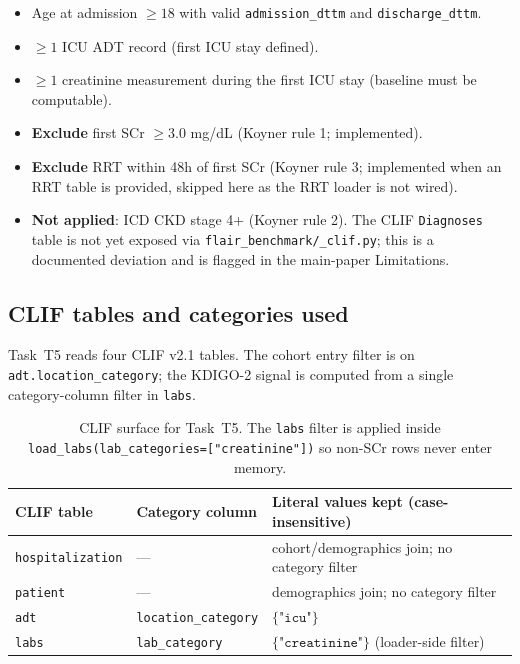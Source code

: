 \documentclass[11pt]{article}
\begin{document}
\begin{itemize}[leftmargin=2em]
  \item Age at admission $\ge 18$ with valid \texttt{admission\_dttm}
        and \texttt{discharge\_dttm}.
  \item $\geq 1$ ICU ADT record (first ICU stay defined).
  \item $\geq 1$ creatinine measurement during the first ICU stay
        (baseline must be computable).
  \item \textbf{Exclude} first SCr $\ge 3.0$ mg/dL (Koyner rule 1;
        implemented).
  \item \textbf{Exclude} RRT within 48h of first SCr (Koyner rule 3;
        implemented when an RRT table is provided, skipped here as the
        RRT loader is not wired).
  \item \textbf{Not applied}: ICD CKD stage 4+ (Koyner rule 2). The
        CLIF \texttt{Diagnoses} table is not yet exposed via
        \texttt{flair\_benchmark/\_clif.py}; this is a documented
        deviation and is flagged in the main-paper Limitations.
\end{itemize}

\subsection{CLIF tables and categories used}
\label{sec:t5-clif}

Task~T5 reads four CLIF v2.1 tables. The cohort entry filter is on
\texttt{adt.location\_category}; the KDIGO-2 signal is computed from a
single category-column filter in \texttt{labs}.

\begin{table}[H]
\centering
\small
\begin{tabular}{@{}llp{7.0cm}@{}}
\toprule
\textbf{CLIF table} & \textbf{Category column} & \textbf{Literal values kept (case-insensitive)} \\
\midrule
\texttt{hospitalization} & ---                       & cohort/demographics join; no category filter \\
\texttt{patient}         & ---                       & demographics join; no category filter \\
\texttt{adt}             & \texttt{location\_category} & $\{\texttt{"icu"}\}$ \\
\texttt{labs}            & \texttt{lab\_category}     & $\{\texttt{"creatinine"}\}$ (loader-side filter) \\
\bottomrule
\end{tabular}
\caption{CLIF surface for Task~T5. The \texttt{labs} filter is applied
inside \texttt{load\_labs(lab\_categories=["creatinine"])} so non-SCr
rows never enter memory.}
\end{table}
\end{document}
